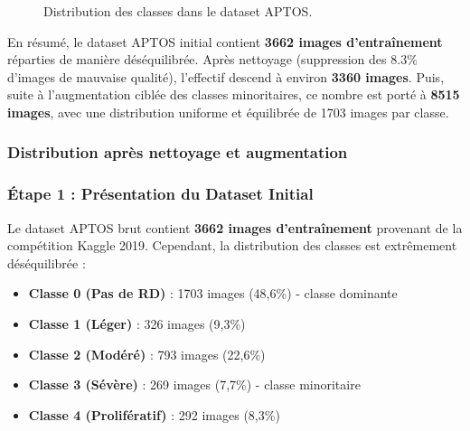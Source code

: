 \documentclass[12pt,a4paper,oneside]{report}
\begin{document}
\begin{figure}[H]
\centering
{}
\caption{Distribution des classes dans le dataset APTOS.}
\label{fig:class_distribution}
\end{figure}

En résumé, le dataset APTOS initial contient \textbf{3662 images d'entraînement} réparties de manière déséquilibrée. Après nettoyage (suppression des 8.3\% d'images de mauvaise qualité), l'effectif descend à environ \textbf{3360 images}. Puis, suite à l'augmentation ciblée des classes minoritaires, ce nombre est porté à \textbf{8515 images}, avec une distribution uniforme et équilibrée de 1703 images par classe.

\subsubsection{Distribution après nettoyage et augmentation}

\subsubsection{Étape 1 : Présentation du Dataset Initial}

Le dataset APTOS brut contient \textbf{3662 images d'entraînement} provenant de la compétition Kaggle 2019. Cependant, la distribution des classes est extrêmement déséquilibrée :

\begin{itemize}
    \item \textbf{Classe 0 (Pas de RD)} : 1703 images (48,6\%) - classe dominante
    \item \textbf{Classe 1 (Léger)} : 326 images (9,3\%)
    \item \textbf{Classe 2 (Modéré)} : 793 images (22,6\%)
    \item \textbf{Classe 3 (Sévère)} : 269 images (7,7\%) - classe minoritaire
    \item \textbf{Classe 4 (Prolifératif)} : 292 images (8,3\%)
\end{itemize}
\end{document}
